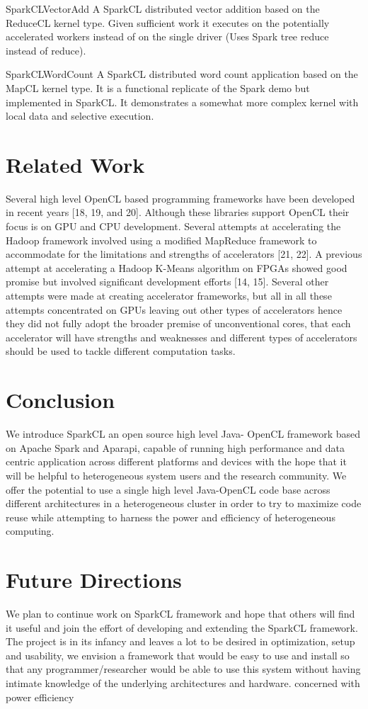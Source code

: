 \documentclass[runningheads,a4paper]{llncs}
\begin{document}
SparkCLVectorAdd
A SparkCL distributed vector addition based on the ReduceCL kernel type. Given sufficient work it executes on the potentially accelerated workers instead of on the single driver (Uses Spark tree reduce instead of reduce).

SparkCLWordCount
A SparkCL distributed word count application based on the MapCL kernel type. It is a functional replicate of the Spark demo but implemented in SparkCL. It demonstrates a somewhat more complex kernel with local data and selective execution.

\section{Related Work}
Several high level OpenCL based programming frameworks have been developed in recent years [18, 19, and 20]. Although these libraries support OpenCL their focus is on GPU and CPU development. Several attempts at accelerating the Hadoop framework involved using a modified MapReduce framework to accommodate for the limitations and strengths of accelerators [21, 22]. A previous attempt at accelerating a Hadoop K-Means algorithm on FPGAs showed good promise but involved significant development efforts [14, 15]. Several other attempts were made at creating accelerator frameworks, but all in all these attempts concentrated on GPUs leaving out other types of accelerators hence they did not fully adopt the broader premise of unconventional cores, that each accelerator will have strengths and weaknesses and different types of accelerators should be used to tackle different computation tasks.

\section{Conclusion}
We introduce SparkCL an open source high level Java- OpenCL framework based on Apache Spark and Aparapi, capable of running high performance and data centric application across different platforms and devices with the hope that it will be helpful to heterogeneous system users and the research community. We offer the potential to use a single high level Java-OpenCL code base across different architectures in a heterogeneous cluster in order to try to maximize code reuse while attempting to harness the power and efficiency of heterogeneous computing.

\section{Future Directions}
We plan to continue work on SparkCL framework and hope that others will find it useful and join the effort of developing and extending the SparkCL framework. The project is in its infancy and leaves a lot to be desired in optimization, setup and usability, we envision a framework that would be easy to use and install so that any programmer/researcher would be able to use this system without having intimate knowledge of the underlying architectures and hardware.
concerned with power efficiency



\end{document}
